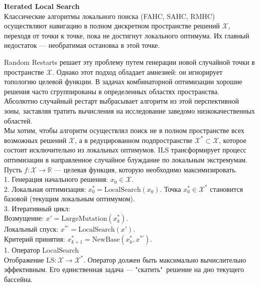 \textbf{Iterated Local Search} \\
Классические алгоритмы локального поиска (FAHC, SAHC, RMHC) осуществляют навигацию в полном дискретном пространстве решений $\mathcal{X}$, переходя от точки к точке, пока не достигнут локального оптимума. Их главный недостаток — необратимая остановка в этой точке.

Random Restarts решает эту проблему путем генерации новой случайной точки в пространстве $\mathcal{X}$. Однако этот подход обладает амнезией: он игнорирует топологию целевой функции. В задачах комбинаторной оптимизации хорошие решения часто сгруппированы в определенных областях пространства. Абсолютно случайный рестарт выбрасывает алгоритм из этой перспективной зоны, заставляя тратить вычисления на исследование заведомо низкокачественных областей. \\
Мы хотим, чтобы алгоритм осуществлял поиск не в полном пространстве всех возможных решений $\mathcal{X}$, а в редуцированном подпространстве $\mathcal{X}^* \subset \mathcal{X}$, которое состоит исключительно из локальных оптимумов. ILS трансформирует процесс оптимизации в направленное случайное блуждание по локальным экстремумам. \\
Пусть $f: \mathcal{X} \to \mathbb{R}$ — целевая функция, которую необходимо максимизировать. \\
1.  Генерация начального решения: $x_0 \in \mathcal{X}$. \\
2.  Локальная оптимизация: $x^*_0 = \text{LocalSearch}(x_0)$. Точка $x^*_0 \in \mathcal{X}^*$ становится базовой (текущим локальным оптимумом). \\
3.  Итеративный цикл: \\
Возмущение: $x' = \text{LargeMutation}(x^*_k)$. \\
Локальный спуск: $x^{*\prime} = \text{LocalSearch}(x')$. \\
Критерий принятия: $x^*_{k+1} = \text{NewBase}(x^*_k, x^{*\prime})$. \\

1. Оператор LocalSearch \\
Отображение $\text{LS}: \mathcal{X} \to \mathcal{X}^*$. Оператор должен быть максимально вычислительно эффективным. Его единственная задача — "скатить"\, решение на дно текущего бассейна.

